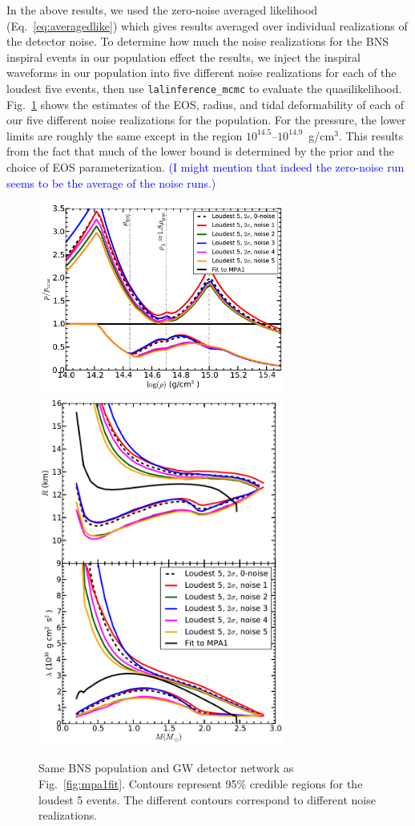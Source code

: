 \documentclass[twocolumn,prd,amssymb,aps,nofootinbib,showpacs,epsf]{revtex4}
\newcommand\les[2]{\textcolor{blue}{{#1}\sout{#2}}}
\begin{document}
In the above results, we used the zero-noise averaged likelihood (Eq.~\eqref{eq:averagedlike}) which gives results averaged over individual realizations of the detector noise. To determine how much the noise realizations for the BNS inspiral events in our population effect the results, we inject the inspiral waveforms in our population into five different noise realizations for each of the loudest five events, then use \texttt{lalinference\_mcmc} to evaluate the quasilikelihood. Fig.~\ref{fig:noise} shows the estimates of the EOS, radius, and tidal deformability of each of our five different noise realizations for the population. For the pressure, the lower limits are roughly the same except in the region $10^{14.5}$--$10^{14.9}$~g/cm$^3$. This results from the fact that much of the lower bound is determined by the prior and the choice of EOS parameterization.  \les{(I might mention that indeed the zero-noise run seems to be the average of the noise runs.)}{}

\begin{figure}[!htb]
\begin{center}
\includegraphics[width=3.2in]{LALMCMCmpa1FitTaylorF2CompareNoiseperror.pdf}\\
\includegraphics[width=3.2in]{LALMCMCmpa1FitTaylorF2CompareNoiseRadiuslambda.pdf}\caption{Same BNS population and GW detector network as Fig.~\ref{fig:mpa1fit}. Contours represent 95\% credible regions for the loudest 5 events. The different contours correspond to different noise realizations.}
\label{fig:noise}
\end{center}
\end{figure}
\end{document}
